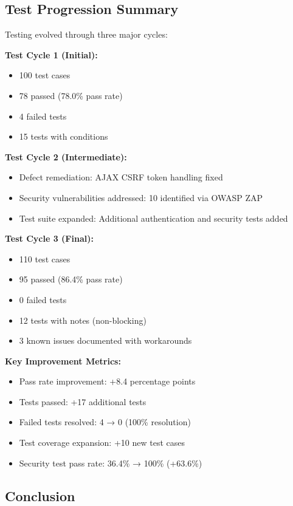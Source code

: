 \subsection{Test Progression Summary}

Testing evolved through three major cycles:

\textbf{Test Cycle 1 (Initial):}
\begin{itemize}
    \item 100 test cases
    \item 78 passed (78.0\% pass rate)
    \item 4 failed tests
    \item 15 tests with conditions
\end{itemize}

\textbf{Test Cycle 2 (Intermediate):}
\begin{itemize}
    \item Defect remediation: AJAX CSRF token handling fixed
    \item Security vulnerabilities addressed: 10 identified via OWASP ZAP
    \item Test suite expanded: Additional authentication and security tests added
\end{itemize}

\textbf{Test Cycle 3 (Final):}
\begin{itemize}
    \item 110 test cases
    \item 95 passed (86.4\% pass rate)
    \item 0 failed tests
    \item 12 tests with notes (non-blocking)
    \item 3 known issues documented with workarounds
\end{itemize}

\textbf{Key Improvement Metrics:}
\begin{itemize}
    \item Pass rate improvement: +8.4 percentage points
    \item Tests passed: +17 additional tests
    \item Failed tests resolved: 4 → 0 (100\% resolution)
    \item Test coverage expansion: +10 new test cases
    \item Security test pass rate: 36.4\% → 100\% (+63.6\%)
\end{itemize}

\subsection{Conclusion}

